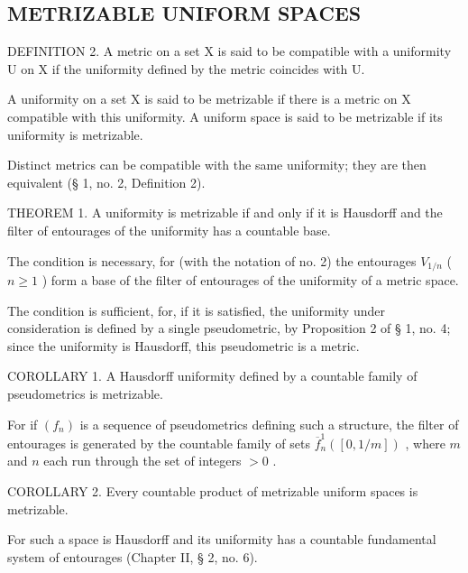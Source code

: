 \subsection{METRIZABLE UNIFORM SPACES}

DEFINITION 2. A metric on a set X is said to be compatible with a uniformity U on X if the uniformity defined by the metric coincides with U.

A uniformity on a set X is said to be metrizable if there is a metric on X compatible with this uniformity. A uniform space is said to be metrizable if its uniformity is metrizable.

Distinct metrics can be compatible with the same uniformity; they are then equivalent (§ 1, no. 2, Definition 2).

THEOREM 1. A uniformity is metrizable if and only if it is Hausdorff and the filter of entourages of the uniformity has a countable base.

The condition is necessary, for (with the notation of no. 2) the entourages \(V_{1/n}\) ( \(n \geqslant 1\) ) form a base of the filter of entourages of the uniformity of a metric space.

The condition is sufficient, for, if it is satisfied, the uniformity under consideration is defined by a single pseudometric, by Proposition 2 of § 1, no. 4; since the uniformity is Hausdorff, this pseudometric is a metric.

COROLLARY 1. A Hausdorff uniformity defined by a countable family of pseudometrics is metrizable.

For if \((f_n)\) is a sequence of pseudometrics defining such a structure, the filter of entourages is generated by the countable family of sets \(\overline{f}_n^1([0, 1/m])\) , where \(m\) and \(n\) each run through the set of integers \(>0\) .

COROLLARY 2. Every countable product of metrizable uniform spaces is metrizable.

For such a space is Hausdorff and its uniformity has a countable fundamental system of entourages (Chapter II, § 2, no. 6).

